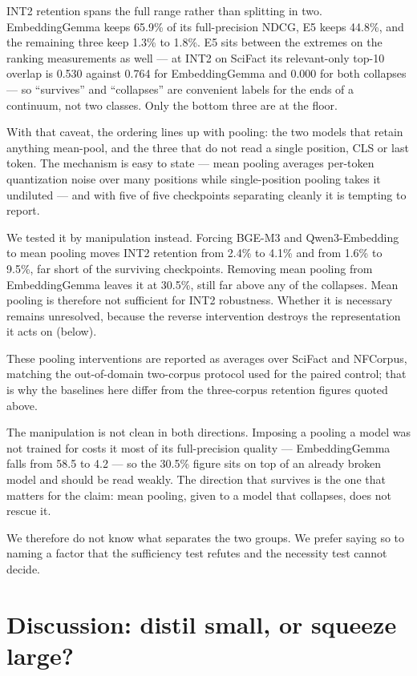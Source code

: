 \documentclass[11pt]{article}
\begin{document}
INT2 retention spans the full range rather than splitting in two. EmbeddingGemma keeps
65.9\% of its full-precision NDCG, E5 keeps 44.8\%, and the remaining three keep 1.3\% to
1.8\%. E5 sits between the extremes on the ranking measurements as well --- at INT2 on SciFact
its relevant-only top-10 overlap is 0.530 against 0.764 for EmbeddingGemma and 0.000 for both
collapses --- so ``survives'' and ``collapses'' are convenient labels for the ends of a
continuum, not two classes. Only the bottom three are at the floor.

With that caveat, the ordering lines up with pooling: the two models that retain anything
mean-pool, and the three that do not read a single position, CLS or last token.
The mechanism is easy to state --- mean pooling averages per-token quantization noise over
many positions while single-position pooling takes it undiluted --- and with five of five
checkpoints separating cleanly it is tempting to report.

We tested it by manipulation instead. Forcing BGE-M3 and Qwen3-Embedding to mean pooling
moves INT2 retention from 2.4\% to 4.1\% and from 1.6\% to 9.5\%, far short of the
surviving checkpoints. Removing mean pooling from EmbeddingGemma leaves it at 30.5\%, still far
above any of the collapses. Mean pooling is therefore not sufficient for INT2 robustness. Whether it is necessary
remains unresolved, because the reverse intervention destroys the representation it acts on
(below).

These pooling interventions are reported as averages over SciFact and NFCorpus, matching the
out-of-domain two-corpus protocol used for the paired control; that is why the baselines here
differ from the three-corpus retention figures quoted above.

The manipulation is not clean in both directions. Imposing a pooling a model was not trained
for costs it most of its full-precision quality --- EmbeddingGemma falls from 58.5 to 4.2 ---
so the 30.5\% figure sits on top of an already broken model and should be read weakly. The
direction that survives is the one that matters for the claim: mean pooling, given to a model
that collapses, does not rescue it.

We therefore do not know what separates the two groups. We prefer saying so to naming a
factor that the sufficiency test refutes and the necessity test cannot decide.

\FloatBarrier
\section{Discussion: distil small, or squeeze large?}
\label{sec:discussion}
\end{document}
